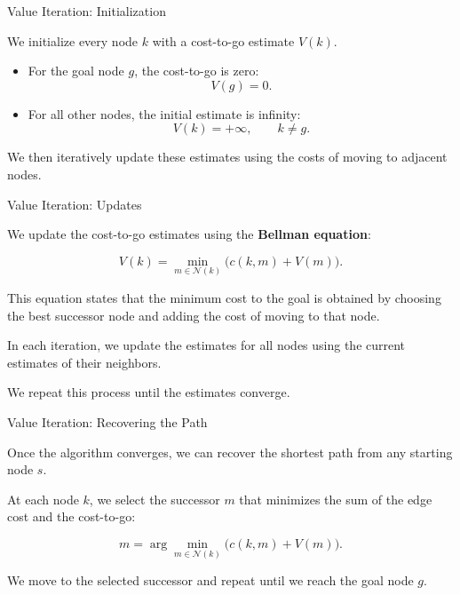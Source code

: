 \documentclass{beamer}
\begin{document}
\begin{frame}{Value Iteration: Initialization}
	\begin{flushleft}
		
		We initialize every node $k$ with a cost-to-go
		estimate $V(k)$.
		
		\begin{itemize}
			\item For the goal node $g$, the cost-to-go is
			zero:
			\[
			V(g)=0.
			\]
			
			\item For all other nodes, the initial estimate
			is infinity:
			\[
			V(k)=+\infty,\qquad k\ne g.
			\]
		\end{itemize}
		
		We then iteratively update these estimates using
		the costs of moving to adjacent nodes.
		
	\end{flushleft}
\end{frame}

\begin{frame}{Value Iteration: Updates}
	\begin{flushleft}
		
		We update the cost-to-go estimates using the
		\textbf{Bellman equation}:
		
		\[
		V(k)=\min_{m\in\mathcal{N}(k)}
		\bigl(c(k,m)+V(m)\bigr).
		\]
		
		This equation states that the minimum cost to
		the goal is obtained by choosing the best
		successor node and adding the cost of moving
		to that node.
		
		\medskip
		In each iteration, we update the estimates for
		all nodes using the current estimates of their
		neighbors.
		
		\medskip
		We repeat this process until the estimates
		converge.
		
	\end{flushleft}
\end{frame}

\begin{frame}{Value Iteration: Recovering the Path}
	\begin{flushleft}
		
		Once the algorithm converges, we can recover
		the shortest path from any starting node $s$.
		
		\medskip
		At each node $k$, we select the successor $m$
		that minimizes the sum of the edge cost and
		the cost-to-go:
		
		\[
		m=\arg\min_{m\in\mathcal{N}(k)}
		\bigl(c(k,m)+V(m)\bigr).
		\]
		
		We move to the selected successor and repeat
		until we reach the goal node $g$.
		
	\end{flushleft}
\end{frame}
\end{document}
